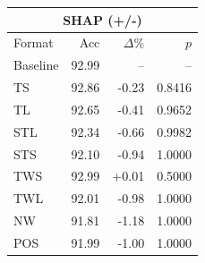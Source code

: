 \begin{tabular}{lrrr}
\toprule
\multicolumn{4}{c}{\textbf{SHAP (+/-)}} \\
\midrule
Format & Acc & $\Delta$\% & $p$ \\
\midrule
Baseline & 92.99 & -- & -- \\
\midrule
TS & 92.86 & -0.23 & 0.8416 \\
TL & 92.65 & -0.41 & 0.9652 \\
STL & 92.34 & -0.66 & 0.9982 \\
STS & 92.10 & -0.94 & 1.0000 \\
TWS & 92.99 & +0.01 & 0.5000 \\
TWL & 92.01 & -0.98 & 1.0000 \\
NW & 91.81 & -1.18 & 1.0000 \\
POS & 91.99 & -1.00 & 1.0000 \\
\bottomrule
\end{tabular}